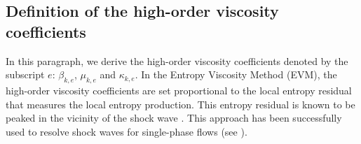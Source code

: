 \documentclass[preprint,10pt]{elsarticle}
\begin{document}
\subsection{Definition of the high-order viscosity coefficients}\label{sec:visc-coeff-ho}
%
In this paragraph, we derive the high-order viscosity coefficients denoted by the subscript $e$: $\beta_{k,e}$, $\mu_{k,e}$ and $\kappa_{k,e}$. 
In the Entropy Viscosity Method (EVM), the high-order viscosity coefficients are set proportional to the local entropy 
residual that measures the local entropy production. This entropy residual is known to be peaked in the vicinity of the shock wave \cite{Leveque}. 
This approach has been successfully used to resolve shock waves for single-phase flows (see \cite{GuermondJCP2011, GuermondCSE2011, GuermondCRA2008,ZinganJCP2013,DelchiniCompFluid2014-euler}). 
\end{document}
